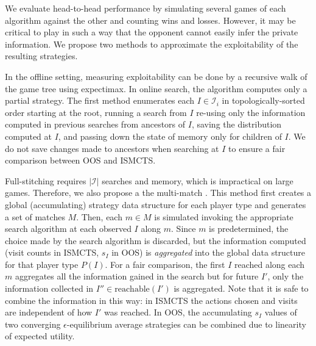 \documentclass[letterpaper]{article}
\newcommand{\cI}{\mathcal{I}}
\newcommand{\defword}[1]{\textbf{\boldmath{#1}}}
\newcounter{mlNoteCounter}
\newcommand{\mlnote}[1]{{\scriptsize \color{darkgreen} $\blacksquare$ \refstepcounter{mlNoteCounter}\textsf{[ML]$_{\arabic{mlNoteCounter}}$:{#1}}}}
\begin{document}

We evaluate head-to-head performance by simulating several games of each algorithm against the other
and counting wins and losses. 
However, %
it may be critical to play in such a way that the opponent cannot easily infer the private information.  
We propose two methods to approximate the exploitability of the resulting strategies. 

In the offline setting, measuring exploitability can be done by a recursive walk of the game 
tree using expectimax. In online search, the algorithm computes only 
a partial strategy. 
The first \defword{full stitching} method 
enumerates each $I \in \cI_i$ in topologically-sorted order starting at the root, 
running a search from $I$ re-using only the information computed in previous searches from ancestors of $I$, saving the 
distribution computed at $I$, and passing down the state of memory only for children of $I$. 
We do not save changes made to ancestors when searching at $I$ to ensure 
a fair comparison between OOS and ISMCTS. 

Full-stitching requires $|\cI|$ searches and memory, which is impractical on large games. 
Therefore, we also propose a the multi-match \defword{aggregate method}. 
This method first creates a global (accumulating) strategy data structure for each player type and generates a 
set of matches $M$. Then, each $m \in M$ is simulated invoking the appropriate search algorithm at each observed 
$I$ along $m$. 
Since $m$ is predetermined, the choice made by the search algorithm is discarded, but the information computed 
(visit counts in ISMCTS, $s_I$ in OOS) is {\it aggregated} into the global data structure for that player type 
$P(I)$. 
For a fair comparison, the first $I$ reached along each $m$ aggregates all the information gained in the search 
but for future $I'$, only the information collected in $I'' \in \mbox{reachable}(I')$ is aggregated.
Note that it is safe to combine the information in this way: in ISMCTS the actions chosen and visits are independent of 
how $I'$ was reached. In OOS, the accumulating $s_I$ values of two converging $\epsilon$-equilibrium average 
strategies can be combined due to linearity of expected utility. 
\end{document}
